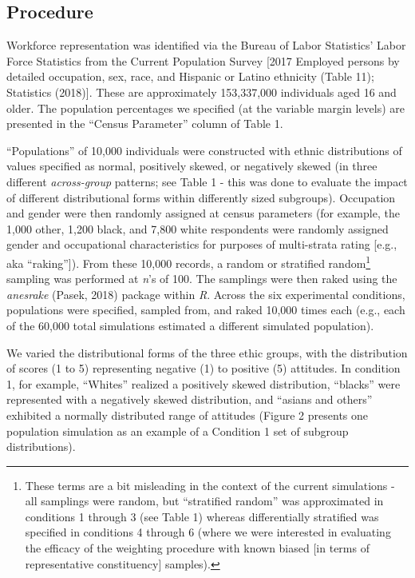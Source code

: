 \documentclass[
  ,man]{apa7}
\begin{document}
\hypertarget{procedure}{%
\subsection{Procedure}\label{procedure}}

Workforce representation was identified via the Bureau of Labor Statistics' Labor Force Statistics from the Current Population Survey {[}2017 Employed persons by detailed occupation, sex, race, and Hispanic or Latino ethnicity (Table 11); Statistics (2018){]}. These are approximately 153,337,000 individuals aged 16 and older. The population percentages we specified (at the variable margin levels) are presented in the ``Census Parameter'' column of Table 1.

``Populations'' of 10,000 individuals were constructed with ethnic distributions of values specified as normal, positively skewed, or negatively skewed (in three different \emph{across-group} patterns; see Table 1 - this was done to evaluate the impact of different distributional forms within differently sized subgroups). Occupation and gender were then randomly assigned at census parameters (for example, the 1,000 other, 1,200 black, and 7,800 white respondents were randomly assigned gender and occupational characteristics for purposes of multi-strata rating {[}e.g., aka ``raking''{]}). From these 10,000 records, a random or stratified random\footnote{These terms are a bit misleading in the context of the current simulations - all samplings were random, but ``stratified random'' was approximated in conditions 1 through 3 (see Table 1) whereas differentially stratified was specified in conditions 4 through 6 (where we were interested in evaluating the efficacy of the weighting procedure with known biased {[}in terms of representative constituency{]} samples).} sampling was performed at \emph{n}'s of 100. The samplings were then raked using the \emph{anesrake} (Pasek, 2018) package within \emph{R}. Across the six experimental conditions, populations were specified, sampled from, and raked 10,000 times each (e.g., each of the 60,000 total simulations estimated a different simulated population).

We varied the distributional forms of the three ethic groups, with the distribution of scores (1 to 5) representing negative (1) to positive (5) attitudes. In condition 1, for example, ``Whites'' realized a positively skewed distribution, ``blacks'' were represented with a negatively skewed distribution, and ``asians and others'' exhibited a normally distributed range of attitudes (Figure 2 presents one population simulation as an example of a Condition 1 set of subgroup distributions).
\end{document}

